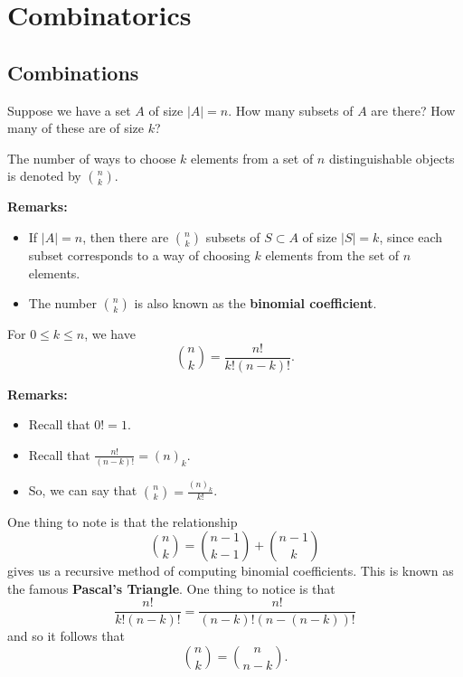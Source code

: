 \documentclass[letterpaper]{article}
\begin{document}
\section{Combinatorics}
\subsection{Combinations}
Suppose we have a set $A$ of size $|A| = n$. How many subsets of $A$ are there? How many of these are of size $k$? 

\begin{definition}{}{}
    The number of ways to choose $k$ elements from a set of $n$ distinguishable objects is denoted by $\binom{n}{k}$.
\end{definition}
\textbf{Remarks:}
\begin{itemize}
    \item If $|A| = n$, then there are $\binom{n}{k}$ subsets of $S \subset A$ of size $|S| = k$, since each subset corresponds to a way of choosing $k$ elements from the set of $n$ elements. 
    \item The number $\binom{n}{k}$ is also known as the \textbf{binomial coefficient}.
\end{itemize}

\begin{theorem}{}{}
    For $0 \leq k \leq n$, we have 
    \[\binom{n}{k} = \frac{n!}{k!(n - k)!}.\]
\end{theorem}
\textbf{Remarks:}
\begin{itemize}
    \item Recall that $0! = 1$.
    \item Recall that $\frac{n!}{(n - k)!} = (n)_k$. 
    \item So, we can say that $\binom{n}{k} = \frac{(n)_k}{k!}$.
\end{itemize}
One thing to note is that the relationship 
\[\binom{n}{k} = \binom{n - 1}{k - 1} + \binom{n - 1}{k}\]
gives us a recursive method of computing binomial coefficients. This is known as the famous \textbf{Pascal's Triangle}.
One thing to notice is that 
\[\frac{n!}{k!(n - k)!} = \frac{n!}{(n - k)!(n - (n - k))!}\]
and so it follows that 
\[\binom{n}{k} = \binom{n}{n - k}.\]
\end{document}
